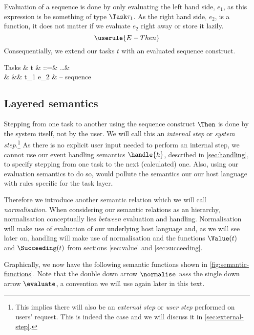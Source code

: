 Evaluation of a sequence is done by only evaluating the left hand side, $e_1$,
as this expression is be something of type $\Task \tau_1$.
As the right hand side, $e_2$, is a function,
it does not matter if we evaluate $e_2$ right away or store it lazily.
\begin{equation*}
  \userule{E-Then}
\end{equation*}
Consequentially, we extend our tasks $t$ with an evaluated sequence construct.
\begin{grammar}
  Tasks
    & t & ::=& \ldots        & \\
    &   &\mid& t_1 \Then e_2 & – sequence \\
\end{grammar}


\subsection{Layered semantics}
\label{sec:normalise}
\label{sec:drive}

Stepping from one task to another using the sequence construct $\Then$ is done by the system itself,
not by the user.
We will call this an \emph{internal step} or \emph{system step}.\footnote{
  This implies there will also be an \emph{external step} or \emph{user step} performed on users' request.
  This is indeed the case and we will discuss it in \autoref{sec:external-step}.
}
As there is no explicit user input needed to perform an internal step,
we cannot use our event handling semantics $\handle{h}$,
described in \autoref{sec:handling},
to specify stepping from one task to the next (calculated) one.
Also,
using our evaluation semantics to do so,
would pollute the semantics our our host language with rules specific for the task layer.

Therefore we introduce another semantic relation which we will call \emph{normalisation}.
When considering our semantic relations as an hierarchy,
normalisation conceptually lies \emph{between} evaluation and handling.
Normalisation will make use of evaluation of our underlying host language and,
as we will see later on,
handling will make use of normalisation
and the functions $\Value(t)$ and $\Succeeding(t)$ from sections \autoref{sec:value} and \autoref{sec:succeeding}.

Graphically,
we now have the following semantic functions shown in \autoref{fig:semantic-functions}.
Note that the double down arrow $\normalise$ \emph{uses} the single down arrow $\evaluate$,
a convention we will use again later in this text.

